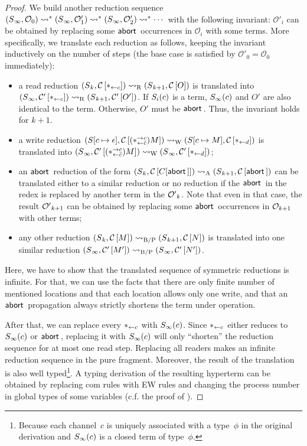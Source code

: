 \begin{proof}
We build another reduction sequence
$
({S}{_\infty},{\mathcal{O}_0})
\rightsquigarrow^\ast
({S}{_\infty},{\mathcal{O}'_1})
\rightsquigarrow^\ast
({S}{_\infty},{\mathcal{O}'_2})
\rightsquigarrow^\ast\cdots
$
with the following invariant:
$\mathcal O'_i$ can be obtained by replacing some $\mathsf{abort\,}$ occurrences
in $\mathcal O_i$ with some terms.
More specifically, we translate each reduction as follows, keeping the
invariant inductively on the number of steps
(the base case is satisfied by $\mathcal O'_0 = \mathcal O_0$ immediately):
\begin{itemize}
 \item a read reduction $({S}{_k},{{\mathcal{C}}\left[{\ast_{\leftarrow{c}}}\right]})
       \rightsquigarrow_{\mathrm R}
       ({S}{_{k+1}},{{\mathcal{C}}\left[{O}\right]})$ is translated into
       $({S}{_\infty},{{\mathcal{C}'}\left[{\ast_{\leftarrow{c}}}\right]}) \rightsquigarrow_{\mathrm R}
       ({S}{_{k+1}},{{\mathcal{C}'}\left[{O'}\right]})$.
       If ${S}_i(c)$ is a term,
       ${S}_\infty(c)$ and $O'$ are also identical to the term.
       Otherwise, $O'$ must be $\mathsf{abort\,}$.
       Thus, the invariant
       holds for $k+1$.
 \item a write reduction $({S}{[c\mapsto \epsilon]},{{\mathcal{C}}\left[{(\ast^{\rightarrow {c}}_{\leftarrow{\bar{c}}})M}\right]}) \rightsquigarrow_{\mathrm W}
	({S}{[c\mapsto M]},{{\mathcal{C}}\left[{\ast_{\leftarrow{d}}}\right]})
	$ is translated into
       $({S}{_\infty},{{\mathcal{C}'}\left[{(\ast^{\rightarrow {c}}_{\leftarrow{\bar{c}}})M}\right]}) \rightsquigarrow_{\mathrm W}
	({S}{_\infty},{{\mathcal{C}'}\left[{\ast_{\leftarrow{d}}}\right]})
	$;
 \item an $\mathsf{abort\,}$ reduction of the form
       $({S}{_k},{{\mathcal{C}}\left[{C[\mathsf{abort\,}]}\right]}) \rightsquigarrow_{\mathrm A}
       ({S}{_{k+1}},{{\mathcal{C}}\left[{\mathsf{abort\,}}\right]})$ can be translated
       either to a similar reduction or no reduction if the $\mathsf{abort\,}$ in
       the redex is replaced by another term in the ${\mathcal{O}'}_k$.
       Note that even in that case, the result ${\mathcal{O}'}_{k+1}$ can
       be obtained by replacing some $\mathsf{abort\,}$ occurrences in
       $\mathcal{O}_{k+1}$ with other terms;
 \item any other reduction $({S}{_k},{{\mathcal{C}}\left[{M}\right]}) \rightsquigarrow_{\mathrm{B/P}}
       ({S}{_{k+1}},{{\mathcal{C}}\left[{N}\right]})$
       is translated into one similar reduction
       $({S}{_\infty},{{\mathcal{C}'}\left[{M'}\right]})\rightsquigarrow_{\mathrm{B/P}}
        ({S}{_\infty},{{\mathcal{C}'}\left[{N'}\right]})$.
\end{itemize}
Here, we have to show that the translated sequence of symmetric
reductions is infinite.
For that, we can use the facts that there are only finite
number of mentioned locations and that each location allows only one
 write, and that an $\mathsf{abort\,}$ propagation always
strictly shortens the term under operation.

 After that, we can replace
 every ${\ast_{\leftarrow{c}}}$ with
 ${S}_\infty(c)$.
 Since $\ast_{\leftarrow{c}}$ either reduces to ${S}_\infty(c)$ or $\mathsf{abort\,}$,
 replacing it with ${S}_\infty(c)$ will only ``shorten'' the reduction
 sequence for at most one read step.
 Replacing all readers
 makes an infinite reduction sequence in the pure fragment.
 Moreover,
 the result of the translation is also well typed\footnote{Because each
 channel~$c$ is uniquely associated with a type~$\phi$ in the original
 derivation and ${S}_\infty(c)$ is a closed term of type~$\phi$.}.
 A typing derivation of the resulting hyperterm can be obtained by
 replacing com rules with EW rules and changing the process number in
 global types of some variables (c.f. the proof of ).


\end{proof}
